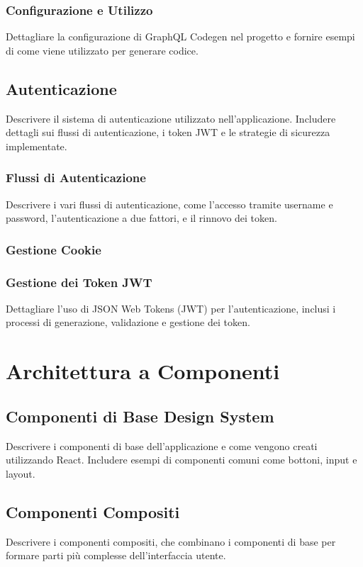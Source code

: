\subsubsection*{Configurazione e Utilizzo}
Dettagliare la configurazione di GraphQL Codegen nel progetto e fornire esempi di come viene utilizzato per generare codice.

\subsection{Autenticazione}
\label{subsec:autenticazione}

Descrivere il sistema di autenticazione utilizzato nell'applicazione. Includere dettagli sui flussi di autenticazione, i token JWT e le strategie di sicurezza implementate.

\subsubsection*{Flussi di Autenticazione}
Descrivere i vari flussi di autenticazione, come l'accesso tramite username e password, l'autenticazione a due fattori, e il rinnovo dei token.

\subsubsection*{Gestione Cookie}

\subsubsection*{Gestione dei Token JWT}
Dettagliare l'uso di JSON Web Tokens (JWT) per l'autenticazione, inclusi i processi di generazione, validazione e gestione dei token.

\section{Architettura a Componenti}
\label{sec:architettura_componenti}

\subsection{Componenti di Base Design System}
Descrivere i componenti di base dell'applicazione e come vengono creati utilizzando React. Includere esempi di componenti comuni come bottoni, input e layout.

\subsection{Componenti Compositi}
Descrivere i componenti compositi, che combinano i componenti di base per formare parti più complesse dell'interfaccia utente.

